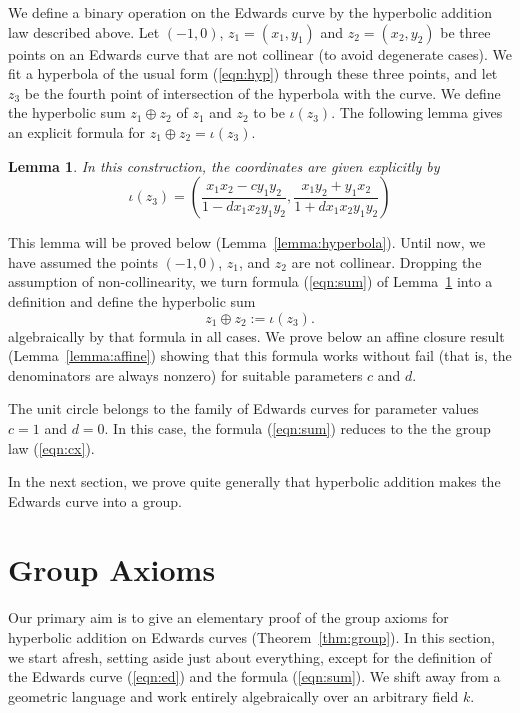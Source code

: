 \documentclass[12pt]{article}
\newtheorem{lemma}[theorem]{Lemma}
\begin{document}
We define a binary operation on the Edwards curve by the hyperbolic
addition law described above.  Let $(-1,0)$, $z_1 = (x_1,y_1)$ and
$z_2=(x_2,y_2)$ be three points on an Edwards curve that are not
collinear (to avoid degenerate cases).  We fit a hyperbola of the
usual form (\ref{eqn:hyp}) through these three points, and let $z_3$
be the fourth point of intersection of the hyperbola with the curve.
We define the hyperbolic sum $z_1\oplus z_2$ of $z_1$ and $z_2$ to be
$\iota(z_3)$.  The following lemma gives an explicit formula for
$z_1\oplus z_2 = \iota(z_3)$.

 
 \begin{lemma}\label{lemma:hyp} 
In this construction, the coordinates are given explicitly by
 \begin{equation}\label{eqn:sum}
 \iota(z_3) = \left(\frac{x_1 x_2 - c y_1 y_2}{1 - d x_1 x_2 y_1 y_2},
\frac{x_1 y_2 + y_1 x_2}{1+d x_1 x_2 y_1 y_2}\right)
 \end{equation}
 \end{lemma}

 This lemma will be proved below (Lemma~\ref{lemma:hyperbola}).  Until
 now, we have assumed the points $(-1,0)$, $z_1$, and $z_2$ are not
 collinear.  Dropping the assumption of non-collinearity, we turn
 formula (\ref{eqn:sum}) of Lemma~\ref{lemma:hyp} into a definition
 and define the hyperbolic sum
\[
 z_1\oplus z_2 := \iota(z_3).
\]
algebraically by that formula in all cases.  We prove below an affine
closure result (Lemma~\ref{lemma:affine}) showing that this formula
works without fail (that is, the denominators are always nonzero) for
suitable parameters $c$ and $d$.

The unit circle belongs to the family of Edwards curves for parameter
values $c=1$ and $d=0$.  In this case, the formula (\ref{eqn:sum})
reduces to the the group law (\ref{eqn:cx}).

In the next section, we prove quite generally that hyperbolic addition
makes the Edwards curve into a group.

\section{Group Axioms}

Our primary aim is to give an elementary proof of the group axioms for
hyperbolic addition on Edwards curves (Theorem~\ref{thm:group}).  In
this section, we start afresh, setting aside just about everything,
except for the definition of the Edwards curve (\ref{eqn:ed}) and
the formula (\ref{eqn:sum}).  We shift away from
a geometric language and work entirely algebraically over an arbitrary
field $k$.
\end{document}
